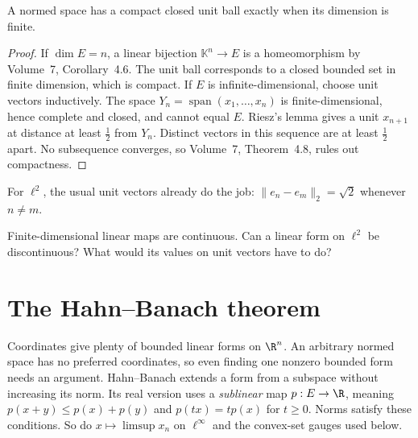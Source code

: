 \begin{theorem}[Riesz]\label{thm:rieszcompact}
A normed space has a compact closed unit ball exactly when its dimension is finite.
\end{theorem}
\begin{proof}
If $\dim E=n$, a linear bijection $\mathbb K^n\to E$ is a homeomorphism by Volume~7, Corollary~4.6. The unit ball corresponds to a closed bounded set in finite dimension, which is compact. If $E$ is infinite-dimensional, choose unit vectors inductively. The space $Y_n=\operatorname{span}(x_1,\dots,x_n)$ is finite-dimensional, hence complete and closed, and cannot equal $E$. Riesz's lemma gives a unit $x_{n+1}$ at distance at least $\frac12$ from $Y_n$. Distinct vectors in this sequence are at least $\frac12$ apart. No subsequence converges, so Volume~7, Theorem~4.8, rules out compactness.
\end{proof}

For $\ell^2$, the usual unit vectors already do the job: $\|e_n-e_m\|_2=\sqrt2$ whenever $n\ne m$.

\begin{think}
Finite-dimensional linear maps are continuous. Can a linear form on $\ell^2$ be discontinuous? What would its values on unit vectors have to do?
\end{think}

\section{The Hahn--Banach theorem}

Coordinates give plenty of bounded linear forms on $\R^n$. An arbitrary normed space has no preferred coordinates, so even finding one nonzero bounded form needs an argument. Hahn--Banach extends a form from a subspace without increasing its norm. Its real version uses a \emph{sublinear} map $p:E\to\R$, meaning $p(x+y)\le p(x)+p(y)$ and $p(tx)=tp(x)$ for $t\ge0$. Norms satisfy these conditions. So do $x\mapsto\limsup x_n$ on $\ell^\infty$ and the convex-set gauges used below.

